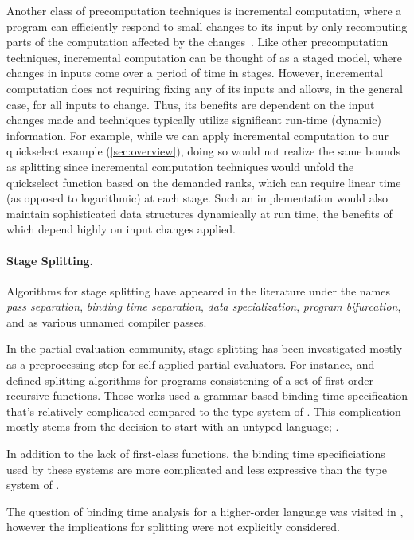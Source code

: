 Another class of precomputation techniques is incremental
computation, where a program can efficiently respond to small changes
to its input by only recomputing parts of the computation affected
by the
changes~\cite{DemersReTe81,PughTe89,RamalingamRe93,AcarBlBlHaTa09}.
Like other precomputation techniques, incremental computation can be
thought of as a staged model, where changes in inputs come over a
period of time in stages.
%
However, incremental computation does not requiring fixing any of its
inputs and allows, in the general case, for all inputs to
change. Thus, its benefits are dependent on the input changes made and
techniques typically utilize significant run-time (dynamic)
information.  For example, while we can apply incremental computation
to our quickselect example (\ref{sec:overview}), doing so would not
realize the same bounds as splitting since incremental computation
techniques would unfold the quickselect function based on the demanded
ranks, which can require linear time (as opposed to logarithmic) at
each stage.  Such an implementation would also maintain sophisticated
data structures dynamically at run time, the benefits of which depend
highly on input changes applied.

\paragraph{Stage Splitting.}

Algorithms for stage splitting have appeared in the literature under the names 
{\em pass separation}, {\em binding time separation}, {\em data specialization}, 
{\em program bifurcation}, and as various unnamed compiler passes.

In the partial evaluation community, stage splitting has been investigated 
mostly as a preprocessing step for self-applied partial evaluators. 
For instance, \cite{Mogensen89a} and \cite{DeNiel91} defined splitting algorithms
for programs consistening of a set of first-order recursive functions.
Those works used a grammar-based binding-time specification that's 
relatively complicated compared to the type system of \lang.
This complication mostly stems from the decision to start with an untyped language;
.

In addition to the lack of first-class functions, 
the binding time specificiations used by these systems are more complicated and less expressive than the type system of \lang.

The question of binding time analysis for a higher-order language was visited in \cite{Mogensen89b},
however the implications for splitting were not explicitly considered.

